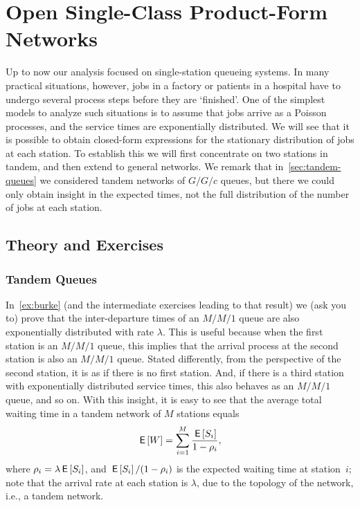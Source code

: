 \documentclass[companion]{subfiles}
\begin{document}
\section{Open Single-Class Product-Form Networks}
\label{sec:jackson-networks}


Up to now our analysis focused on single-station queueing systems.
In many practical situations, however, jobs in a factory or patients in a hospital have to undergo several process steps before they are `finished'.
One of the simplest models to analyze such situations is to assume that jobs arrive as a Poisson processes, and the service times are exponentially distributed.
We will see that it is possible to obtain closed-form expressions for the stationary distribution of jobs at each station.
To establish this we will first concentrate on two stations in tandem, and then extend to general networks.
We remark that in~\cref{sec:tandem-queues} we considered tandem networks of $G/G/c$ queues, but there we could only obtain insight in the expected times, not the full distribution of the number of jobs at each station.

\subsection*{Theory and Exercises}




\subsubsection{Tandem Queues}

In~\cref{ex:burke} (and the intermediate exercises leading to that result) we (ask you to) prove that the inter-departure times of an $M/M/1$ queue are also exponentially distributed with rate $\lambda$.
This is useful because when the first station is an $M/M/1$ queue, this implies that the arrival process at the second station is also an $M/M/1$ queue.
Stated differently, from the perspective of the second station, it is as if there is no first station.
And, if there is a third station with exponentially distributed service times, this also behaves as an $M/M/1$ queue, and so on.
With this insight, it is easy to see that the average total waiting time in a tandem network of $M$ stations equals
\begin{equation*}
  \,\mathsf{E}\left[W\right] = \sum_{i=1}^M \frac{\,\mathsf{E}\left[S_i\right]}{1-\rho_i},
\end{equation*}
where $\rho_i = \lambda \,\mathsf{E}\left[S_i\right]$, and $\,\mathsf{E}\left[S_i\right]/(1-\rho_i)$ is the expected waiting time at station~$i$; note that the arrival rate at each station is $\lambda$, due to the topology of the network, i.e., a tandem network.
\end{document}
